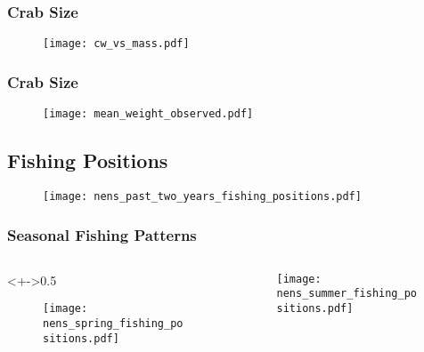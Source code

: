 
\begin{frame}
\frametitle{Crab Size}
\begin{figure}

 \vspace*{-.5cm}
 \centerline{\texttt{[image: cw\_vs\_mass.pdf]}}

 \end{figure}
\end{frame}


\begin{frame}
\frametitle{Crab Size}
\begin{figure}

 \vspace*{-.5cm}
 \centerline{\texttt{[image: mean\_weight\_observed.pdf]}}

 \end{figure}
\end{frame}


\subsection{Fishing Positions}
\begin{frame}
\begin{figure}

 \vspace*{-.3cm}
 \centerline{\texttt{[image: nens\_past\_two\_years\_fishing\_positions.pdf]}}

 \end{figure}
\end{frame}

\begin{frame}
\frametitle{Seasonal Fishing Patterns}

\begin{columns}
\begin{column}<+->{0.5\textwidth}
 \vspace*{-0.5cm}
\begin{figure}
\centerline{\texttt{[image: nens\_spring\_fishing\_positions.pdf]}}

\end{figure}
\end{column}

\begin{column}{0.5\textwidth}
\begin{figure}
 \vspace*{-0.5cm}

\centerline{\texttt{[image: nens\_summer\_fishing\_positions.pdf]}}

 \end{figure}

\end{column}
\end{columns}

\end{frame}

